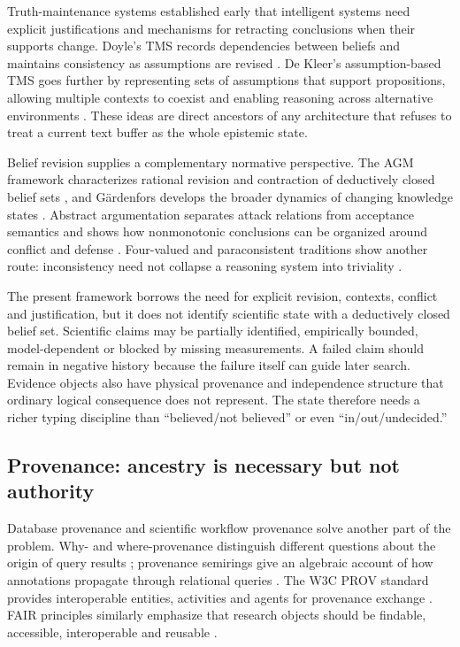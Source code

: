 Truth-maintenance systems established early that intelligent systems need explicit justifications and mechanisms for retracting conclusions when their supports change. Doyle's TMS records dependencies between beliefs and maintains consistency as assumptions are revised \cite{doyle1979}. De Kleer's assumption-based TMS goes further by representing sets of assumptions that support propositions, allowing multiple contexts to coexist and enabling reasoning across alternative environments \cite{dekleer1986}. These ideas are direct ancestors of any architecture that refuses to treat a current text buffer as the whole epistemic state.

Belief revision supplies a complementary normative perspective. The AGM framework characterizes rational revision and contraction of deductively closed belief sets \cite{agm1985}, and G\"ardenfors develops the broader dynamics of changing knowledge states \cite{gardenfors1988}. Abstract argumentation separates attack relations from acceptance semantics and shows how nonmonotonic conclusions can be organized around conflict and defense \cite{dung1995}. Four-valued and paraconsistent traditions show another route: inconsistency need not collapse a reasoning system into triviality \cite{belnap1977}.

The present framework borrows the need for explicit revision, contexts, conflict and justification, but it does not identify scientific state with a deductively closed belief set. Scientific claims may be partially identified, empirically bounded, model-dependent or blocked by missing measurements. A failed claim should remain in negative history because the failure itself can guide later search. Evidence objects also have physical provenance and independence structure that ordinary logical consequence does not represent. The state therefore needs a richer typing discipline than ``believed/not believed'' or even ``in/out/undecided.''

\subsection{Provenance: ancestry is necessary but not authority}

Database provenance and scientific workflow provenance solve another part of the problem. Why- and where-provenance distinguish different questions about the origin of query results \cite{buneman2001}; provenance semirings give an algebraic account of how annotations propagate through relational queries \cite{green2007}. The W3C PROV standard provides interoperable entities, activities and agents for provenance exchange \cite{prov2013}. FAIR principles similarly emphasize that research objects should be findable, accessible, interoperable and reusable \cite{wilkinson2016}.

